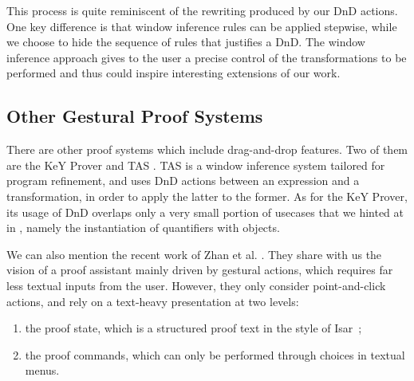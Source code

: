 This process is quite reminiscent of the rewriting produced by our DnD
actions.  One key difference is that window inference rules can be
applied stepwise, while we choose to hide the sequence of rules that
justifies a DnD. The window inference approach gives to the user a
precise control of the transformations to be performed and thus could
inspire interesting extensions of our work.



\subsection*{Other Gestural Proof Systems}

There are other proof systems which include drag-and-drop features. Two of them
are the KeY Prover  and TAS
. TAS is a window inference system tailored for program
refinement, and uses DnD actions between an expression and a transformation, in
order to apply the latter to the former.
As for the KeY Prover, its usage of DnD overlaps only a very small
portion of usecases that we hinted at in , namely
the instantiation of quantifiers with objects.

We can also mention the recent work of Zhan et al. .
They share with us the vision of a proof assistant mainly driven by gestural
actions, which requires far less textual inputs from the user. However, they
only consider point-and-click actions, and rely on a text-heavy presentation at
two levels:
\begin{enumerate}
  \item the proof state, which is a structured proof text in the style of
  Isar~;
  \item the proof commands, which can only be performed through choices in textual menus.
\end{enumerate}

